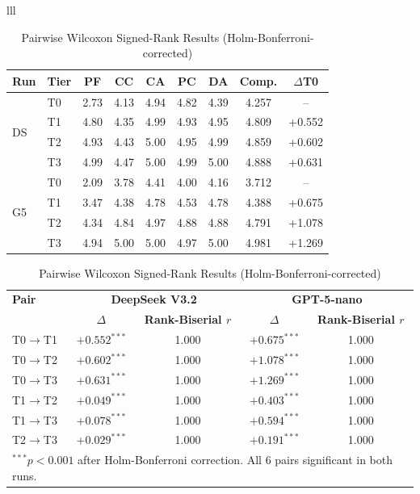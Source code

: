 \documentclass[conference]{IEEEtran}
\begin{document}
\begin{table}[htbp]
\begin{center}
\begin{tabular}{lll}
\begin{table}[htbp]
\caption{Ablation Results: Mean Scores by Tier (DS=DeepSeek V3.2, G5=GPT-5-nano)}
\label{tab:ablation_results}
\begin{center}
\scriptsize
\setlength{\tabcolsep}{6pt}
\begin{tabular}{llccccccc}
\toprule
\textbf{Run} & \textbf{Tier} & \textbf{PF} & \textbf{CC} & \textbf{CA} & \textbf{PC} & \textbf{DA} & \textbf{Comp.} & \textbf{$\Delta$T0} \\
\midrule
\multirow{4}{*}{DS}
 & T0 & 2.73 & 4.13 & 4.94 & 4.82 & 4.39 & 4.257 & {--} \\
 & T1 & 4.80 & 4.35 & 4.99 & 4.93 & 4.95 & 4.809 & +0.552 \\
 & T2 & 4.93 & 4.43 & 5.00 & 4.95 & 4.99 & 4.859 & +0.602 \\
 & T3 & 4.99 & 4.47 & 5.00 & 4.99 & 5.00 & 4.888 & +0.631 \\
\midrule
\multirow{4}{*}{G5}
 & T0 & 2.09 & 3.78 & 4.41 & 4.00 & 4.16 & 3.712 & {--} \\
 & T1 & 3.47 & 4.38 & 4.78 & 4.53 & 4.78 & 4.388 & +0.675 \\
 & T2 & 4.34 & 4.84 & 4.97 & 4.88 & 4.88 & 4.791 & +1.078 \\
 & T3 & 4.94 & 5.00 & 5.00 & 4.97 & 5.00 & 4.981 & +1.269 \\
\bottomrule
\end{tabular}
\end{center}
\end{table}

\begin{table}[htbp]
\caption{Pairwise Wilcoxon Signed-Rank Results (Holm-Bonferroni-corrected)}
\label{tab:significance}
\begin{center}
\scriptsize
\setlength{\tabcolsep}{4pt}
\begin{tabular}{lcccc}
\toprule
\textbf{Pair} & \multicolumn{2}{c}{\textbf{DeepSeek V3.2}} & \multicolumn{2}{c}{\textbf{GPT-5-nano}} \\
 & \textbf{$\Delta$} & \textbf{Rank-Biserial $r$} & \textbf{$\Delta$} & \textbf{Rank-Biserial $r$} \\
\midrule
T0$\to$T1 & $+0.552^{***}$ & 1.000 & $+0.675^{***}$ & 1.000 \\
T0$\to$T2 & $+0.602^{***}$ & 1.000 & $+1.078^{***}$ & 1.000 \\
T0$\to$T3 & $+0.631^{***}$ & 1.000 & $+1.269^{***}$ & 1.000 \\
T1$\to$T2 & $+0.049^{***}$ & 1.000 & $+0.403^{***}$ & 1.000 \\
T1$\to$T3 & $+0.078^{***}$ & 1.000 & $+0.594^{***}$ & 1.000 \\
T2$\to$T3 & $+0.029^{***}$ & 1.000 & $+0.191^{***}$ & 1.000 \\
\bottomrule
\multicolumn{5}{l}{$^{***}p < 0.001$ after Holm-Bonferroni correction. All 6 pairs significant in both runs.}
\end{tabular}
\end{center}
\end{table}


\end{tabular}
\end{center}
\end{table}
\end{document}
